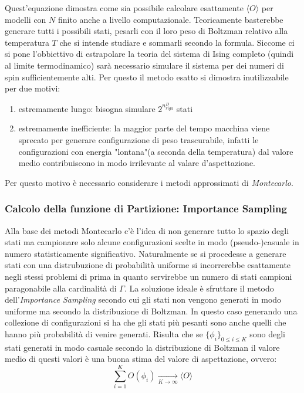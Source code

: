 \documentclass[11pt]{article}
\theoremstyle{plain}
\begin{document}
Quest'equazione dimostra come sia possibile calcolare esattamente $\langle O \rangle$ per modelli con $N$ finito anche a livello computazionale. Teoricamente basterebbe generare tutti i possibili stati, pesarli con il loro peso di Boltzman relativo alla temperatura $T$ che si intende studiare e sommarli secondo la formula.
Siccome ci si pone l'obbiettivo  di estrapolare la teoria del sistema di Ising completo (quindi al limite termodinamico) sarà necessario simulare il sistema per dei numeri di spin sufficientemente alti.
Per questo il metodo esatto si dimostra inutilizzabile per due motivi: 
\begin{enumerate}
\item estremamente lungo: bisogna simulare $2^{n_{riga}^D}$ stati
\item estremamente inefficiente: la maggior parte del tempo macchina viene sprecato per generare configurazione di peso trascurabile, infatti le configurazioni con energia "lontana"(a seconda della temperatura) dal valore medio contribuiscono in modo irrilevante al valare d'aspettazione.
\end{enumerate}
Per questo motivo è necessario considerare i metodi approssimati di \emph{Montecarlo}.

\subsubsection{Calcolo della funzione di Partizione: Importance Sampling}
Alla base dei metodi Montecarlo c'è l'idea di non generare tutto lo spazio degli stati ma campionare solo alcune configurazioni scelte in modo (pseudo-)casuale in numero statisticamente significativo.
Naturalmente se si procedesse a generare stati con una distrubuzione di probabilità uniforme si incorrerebbe esattamente negli stessi problemi di prima in quanto servirebbe un numero di stati campioni paragonabile alla cardinalità di $\Gamma$.
La soluzione ideale è sfruttare il metodo dell'\emph{Importance Sampling} secondo cui gli stati non vengono generati in modo uniforme ma secondo la distribuzione di Boltzman. In questo caso generando una collezione di configurazioni si ha che gli stati più pesanti sono anche quelli che hanno più probabilità di venire generati.
Risulta che se $\lbrace\phi_i\rbrace _{0\leq i \leq K}$ sono degli stati generati in modo casuale secondo la distribuzione di Boltzman il valore medio di questi valori è una buona stima del valore di aspettazione, ovvero:
\begin{equation}\label{aspettazione Monte}
\sum_{i=1}^K O(\phi_i) \xrightarrow[K\rightarrow \infty]{} \langle O \rangle
\end{equation}
\end{document}
